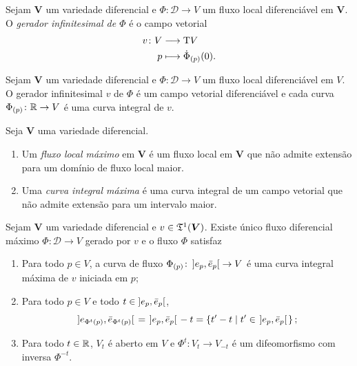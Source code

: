 
\begin{definition}
Sejam $\bm V$ um variedade diferencial e $\Phi\colon \mathscr{D} \to V$ um fluxo local diferenciável em $\bm V$. O \emph{gerador infinitesimal de $\Phi$} é o campo vetorial
	\begin{align*}
	{v}\colon {V} &\longrightarrow {\mathrm{T}V} \\{p} &\longmapsto \dot \Phi_{(p)}(0).
	\end{align*}
\end{definition}

\begin{proposition}
Sejam $\bm V$ um variedade diferencial e $\Phi\colon \mathscr{D} \to V$ um fluxo local diferenciável em $V$. O gerador infinitesimal $v$ de $\Phi$ é um campo vetorial diferenciável e cada curva $\Phi_{(p)}\colon \mathbb{R} \to V$ é uma curva integral de $v$.
\end{proposition}

\begin{definition}
Seja $\bm V$ uma variedade diferencial.
	\begin{enumerate}
	\item Um \emph{fluxo local máximo} em $\bm V$ é um fluxo local em $\bm V$ que não admite extensão para um domínio de fluxo local maior.
	
	\item Uma \emph{curva integral máxima} é uma curva integral de um campo vetorial que não admite extensão para um intervalo maior.
	\end{enumerate}
\end{definition}

\begin{proposition}
Sejam $\bm V$ um variedade diferencial e $v \in \mathfrak{T}^1(\bm V)$. Existe único fluxo diferencial máximo $\Phi\colon \mathscr{D} \to V$ gerado por $v$ e o fluxo $\Phi$ satisfaz
	\begin{enumerate}
	\item Para todo $p \in V$, a curva de fluxo $\Phi_{(p)}\colon \left]{e_p},{\bar e_p}\right[ \to V$ é uma curva integral máxima de $v$ iniciada em $p$;
	
	\item Para todo $p \in V$ e todo $t \in \left]{e_p},{\bar e_p}\right[$,
	\begin{equation*}
	\left.]e_{\Phi^t(p)},\bar e_{\Phi^t(p)}[\right. = \left.]e_p,\bar e_p[\right. - t = \left\{{t'-t}\;\middle\vert\;{t' \in \left.]e_p,\bar e_p[\right.}\right\};
	\end{equation*}
	
	\item Para todo $t \in \mathbb{R}$, $V_t$ é aberto em $V$ e $\Phi^t\colon V_t \to V_{-t}$ é um difeomorfismo com inversa $\Phi^{-t}$.
	\end{enumerate}
\end{proposition}


